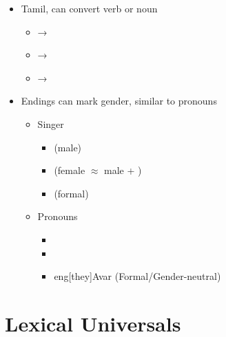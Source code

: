\documentclass[headrule,footrule]{foils}
\begin{document}
\begin{itemize}\addtolength{\itemsep}{-1em}
\item Tamil, can convert verb or noun
  \begin{itemize}
  \item  {}  →  
\item  {}  →  
\item {}  →  
  \end{itemize}
\item Endings can mark gender, similar to pronouns
  \begin{itemize}
  \item Singer
    \begin{itemize}
    \item {}    (male)
    \item  {}  (female \ensuremath{\approx} male
      +   )
      \item  {}  (formal)
    \end{itemize}
  \item Pronouns
    \begin{itemize}
    \item   {} 
    \item   {} 
    \item   {} eng[they]{Avar} (Formal/Gender-neutral)
 
    \end{itemize}
  \end{itemize}
\end{itemize}

\section{Lexical Universals}

\end{document}
